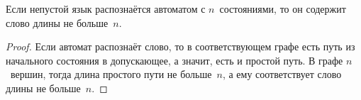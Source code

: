 \begin{statement}
Если непустой язык распознаётся автоматом с $n$~состояниями, то он содержит слово длины не больше~$n$.
\end{statement}
\begin{proof}
Если автомат распознаёт слово, то в соответствующем графе есть путь из начального состояния в допускающее, а значит, есть и простой путь.
В графе $n$~вершин, тогда длина простого пути не больше~$n$, а ему соответствует слово длины не больше~$n$.
\end{proof}